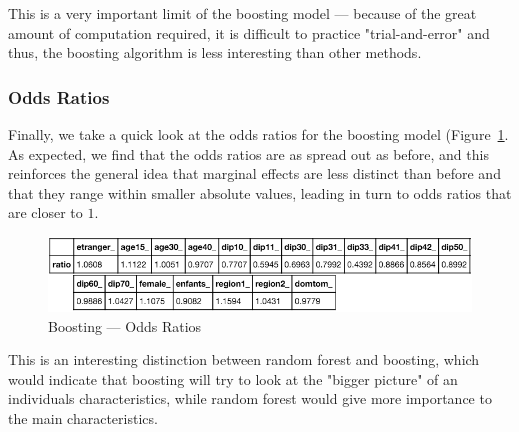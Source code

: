This is a very important limit of the boosting model --- because of the great amount of computation required, it is difficult to practice "trial-and-error" and thus, the boosting algorithm is less interesting than other methods.

\subsubsection{Odds Ratios}
Finally, we take a quick look at the odds ratios for the boosting model (Figure~\ref{fig:boosting_odds_ratios}. As expected, we find that the odds ratios are as spread out as before, and this reinforces the general idea that marginal effects are less distinct than before and that they range within smaller absolute values, leading in turn to odds ratios that are closer to $1$.

\begin{figure}
    \centering
    \includegraphics[scale=0.25]{img/boosting_odds_ratios.png}
    \caption{Boosting --- Odds Ratios}
    \label{fig:boosting_odds_ratios}
\end{figure}

This is an interesting distinction between random forest and boosting, which would indicate that boosting will try to look at the "bigger picture" of an individuals characteristics, while random forest would give more importance to the main characteristics.
